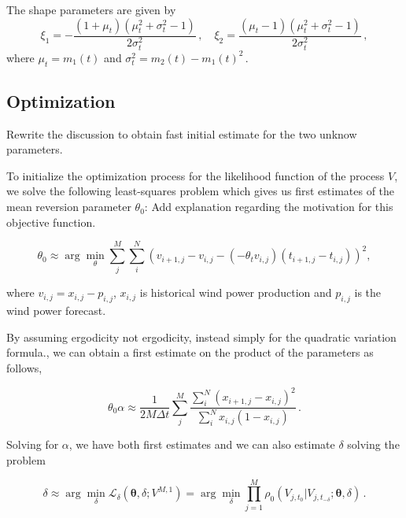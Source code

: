 \documentclass[11pt]{article}
\theoremstyle{definition}
\begin{document}
The shape parameters are given by
\begin{equation}
\xi_1 = - \frac{(1+\mu_t )(\mu_t^2 + \sigma_t^2 -1)}{2 \sigma_t^2}\,, \quad \xi_2=  \frac{(\mu_t-1 )(\mu_t^2 + \sigma_t^2 -1)}{2 \sigma_t^2} \,, \label{param_transformed_beta}
\end{equation}
where $\mu_t = m_1 (t)$ and $\sigma_t^2= m_2 (t)- m_1 (t)^2\,.$

\subsection{Optimization} \label{opt_sec}
{\color{red} Rewrite the discussion to obtain fast initial estimate for the two unknow parameters.}

To initialize the optimization process for the likelihood function of the process $V$, we solve the following least-squares problem which gives us first estimates of the mean reversion parameter $\theta_0$: {\color{red} Add explanation regarding the motivation for this objective function.}

\begin{equation}
\theta_0\approx\arg\min_{\theta} \sum\limits_{j}^M \sum\limits_i^N \left( v_{i+1,j}  - v_{i,j}- \left( - \theta_t v_{i,j}\right) \left(t_{i+1,j} - t_{i,j} \right)  \right)^2,
\label{inital_theta}
\end{equation}
 
 where $v_{i,j}=x_{i,j}-p_{i,j}$,  $x_{i,j}$ is historical wind power production and $p_{i,j}$ is the wind power forecast.
 
 By assuming ergodicity {\color{red} not ergodicity, instead simply for the quadratic variation formula.}, we can obtain a first estimate on the product of the parameters as follows,
 
\begin{equation}
\theta_0 \alpha \approx \frac{1}{2M\Delta t} \sum\limits_j^M \frac{ \sum\limits_i^N (x_{i+1,j}  - x_{i,j})^2}{ \sum\limits_i^N x_{i,j}(1-x_{i,j}) } \,.
\end{equation}

Solving for $\alpha$, we have both first estimates and we can also estimate $\delta$ solving the problem


\begin{equation}
\delta\approx\arg\min_{\delta}\mathcal{L}_{\delta}(\bm{\theta},\delta; V^{M,1}) = \arg\min_{\delta}\prod\limits_{j=1}^M \rho_0 (V_{j, t_0}|V_{j, t_{-\delta}};\bm{\theta},\delta) \,.
\label{likelihood_delta}
\end{equation}
\end{document}

